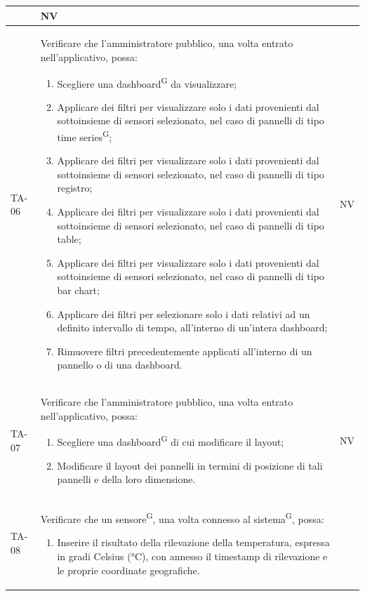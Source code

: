 \documentclass[8pt]{article}
\newcommand{\glossterm}[1]{#1\textsuperscript{G}} %
\begin{document}
\begin{longtable}{|>{\centering}p{2cm}|>{\RaggedRight}m{12cm}|>{\centering\arraybackslash}p{2cm}|}
\begin{enumerate}
    \end{enumerate}
    & NV \\
    \hline
    TA-06 & Verificare che l'amministratore pubblico, una volta entrato nell’applicativo, possa:
    \begin{enumerate}
        \item Scegliere una \glossterm{dashboard} da visualizzare;
        \item Applicare dei filtri per visualizzare solo i dati provenienti dal sottoinsieme di sensori selezionato, nel caso di pannelli di tipo \glossterm{time series}; 
        \item Applicare dei filtri per visualizzare solo i dati provenienti dal sottoinsieme di sensori selezionato, nel caso di pannelli di tipo registro;
        \item Applicare dei filtri per visualizzare solo i dati provenienti dal sottoinsieme di sensori selezionato, nel caso di pannelli di tipo table;
        \item Applicare dei filtri per visualizzare solo i dati provenienti dal sottoinsieme di sensori selezionato, nel caso di pannelli di tipo bar chart;  
        \item Applicare dei filtri per selezionare solo i dati relativi ad un definito intervallo di tempo, all’interno di un’intera dashboard;
        \item Rimuovere filtri precedentemente applicati all'interno di un pannello o di una dashboard.
    \end{enumerate}
    & NV \\
    \hline
    TA-07 & Verificare che l'amministratore pubblico, una volta entrato
    nell’applicativo, possa:
    \begin{enumerate}
        \item Scegliere una \glossterm{dashboard} di cui modificare il layout;
        \item Modificare il layout dei pannelli in termini di posizione di tali pannelli e della loro dimensione.
    \end{enumerate}
    & NV \\
    \hline
    TA-08 &
    Verificare che un \glossterm{sensore}, una volta connesso al \glossterm{sistema}, possa:
    \begin{enumerate}
        \item Inserire il risultato della rilevazione della temperatura, espressa in gradi Celsius
            (°C), con annesso il timestamp di rilevazione e le proprie coordinate geografiche.        

\end{enumerate}
\end{longtable}
\end{document}
